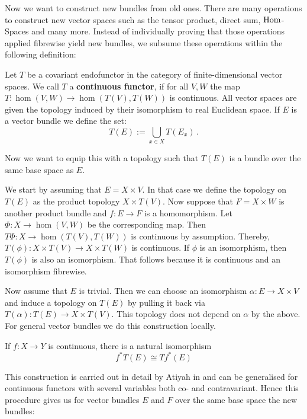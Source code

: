 Now we want to construct new bundles from old ones. There are many operations to construct new vector spaces such as the tensor product, direct sum, $\operatorname{\mathrm{Hom}}$-Spaces and many more. Instead of individually proving that those operations applied fibrewise yield new bundles, we subsume these operations within the following definition: 

\begin{definition}
	Let $T$ be a covariant endofunctor in the category of finite-dimensional vector spaces. We call $T$ a \textbf{continuous functor}, if for all $V,W$ the map $T:\hom(V,W)\to \hom(T(V),T(W))$ is continuous. All vector spaces are given the topology induced by their isomorphism to real Euclidean space. If $E$  is a vector bundle we define the set:
	\begin{equation*}
		T(E):=\bigcup_{x\in X}T(E_x)\,.
	\end{equation*} 
\end{definition}
Now we want to equip this with a topology such that $T(E)$ is a bundle over the same base space as $E$.
\begin{definition}\label{def:vb-constructingNewBundles}
	We start by assuming that $E = X\times V$. In that case we define the topology on $T(E)$ as the product topology $X\times T(V)$. Now suppose that $F = X \times W$ is another product bundle and $f:E\to F$ is a homomorphism. Let $\Phi: X \to \hom(V,W)$ be the corresponding map. Then $T\Phi: X\to \hom(T(V),T(W))$ is continuous by assumption. Thereby, $T(\phi):X\times T(V)\to X\times T(W)$ is continuous. If $\phi$ is an isomorphism, then $T(\phi)$ is also an isomorphism. That follows because it is continuous and an isomorphism fibrewise.
	
	Now assume that $E$ is trivial. Then we can choose an isomorphism $\alpha: E\to X\times V$ and induce a topology on $T(E)$ by pulling it back via $T(\alpha) : T(E) \to X\times T(V)$. This topology does not depend on $\alpha$ by the above. 
	For general vector bundles we do this construction locally. 
	
	If $f:X\to Y$ is continuous, there is a natural isomorphism
	\begin{equation*}
		f^*T(E)\cong Tf^*(E)
	\end{equation*}

\end{definition}
	This construction is carried out in detail by Atiyah in \cite[Chapter 1.2]{atiyah1989k} and can be generalised for continuous functors with several variables both co- and contravariant. Hence this procedure gives us for vector bundles $E$ and $F$ over the same base space the new bundles:
